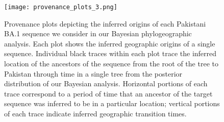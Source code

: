 \begin{figure}[!htbp]%
    \centering
    \texttt{[image: provenance\_plots\_3.png]}
    \caption[provenance plot 4]{Provenance plots depicting the inferred origins of each Pakistani BA.1 sequence we consider in our Bayesian phylogeographic analysis. Each plot shows the inferred geographic origins of a single sequence. Individual black traces within each plot trace the inferred location of the ancestors of the sequence from the root of the tree to Pakistan through time in a single tree from the posterior distribution of our Bayesian analysis. Horizontal portions of each trace correspond to a period of time that an ancestor of the target sequence was inferred to be in a particular location; vertical portions of each trace indicate inferred geographic transition times.}
    \label{sfig:prov3}
\end{figure}


\cleardoublepage

